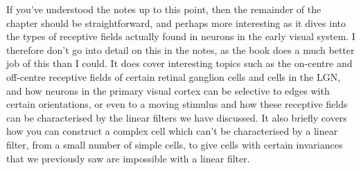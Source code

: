 \documentclass{article}
\begin{document}
If you've understood the notes up to this point, then the remainder of the chapter should be straightforward, and perhaps more interesting as it dives into the types of receptive fields actually found in neurons in the early visual system. I therefore don't go into detail on this in the notes, as the book does a much better job of this than I could. It does cover interesting topics such as the on-centre and off-centre receptive fields of certain retinal ganglion cells and cells in the LGN, and how neurons in the primary visual cortex can be selective to edges with certain orientations, or even to a moving stimulus and how these receptive fields can be characterised by the linear filters we have discussed. It also briefly covers how you can construct a complex cell which can't be characterised by a linear filter, from a small number of simple cells, to give cells with certain invariances that we previously saw are impossible with a linear filter.\\
\end{document}
